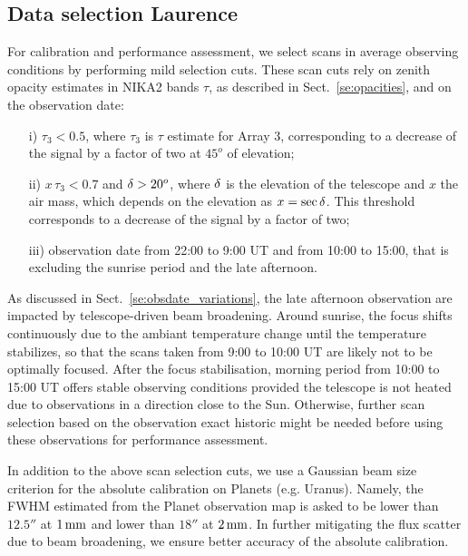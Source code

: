 


\subsection{Data selection {\color{blue} Laurence}}
\label{se:data_selection}

For calibration and performance assessment, we select scans in average
observing conditions by performing mild selection cuts. These scan
cuts rely on zenith opacity estimates in NIKA2 bands $\tau$, as
described in Sect.~\ref{se:opacities}, and on the observation date:
%
\begin{itemize}
\item[i)] $\tau_{3} < 0.5$, where $\tau_{3}$ is $\tau$ estimate for
  Array 3, corresponding to a decrease of the signal by a factor of
  two at $45^{o}$ of elevation;
\item[ii)] $x\, \tau_{3} < 0.7$ and $\delta > 20^{o}$, where $\delta$ is the
  elevation of the telescope and $x$ the
  air mass, which depends on the elevation as $x=\sec \delta$. This
  threshold corresponds to a decrease of the signal by a factor of two;
\item[iii)] observation date from 22:00 to 9:00 UT and from 10:00 to
  15:00, that is excluding the sunrise period and the late afternoon.
\end{itemize}
%
As discussed in Sect.~\ref{se:obsdate_variations}, the late afternoon
observation are impacted by telescope-driven beam broadening. Around
sunrise, the focus shifts continuously due to the ambiant temperature
change until the temperature stabilizes, so that the scans taken from
9:00 to 10:00 UT are likely not to be optimally focused.
After the focus stabilisation, morning period 
from 10:00 to 15:00 UT offers stable observing conditions
provided the telescope is not heated due to observations in a
direction close to the Sun.  Otherwise, further scan selection based on the
observation exact historic might be needed before using these
observations for performance assessment.

   
In addition to the above scan selection cuts, we use a Gaussian beam
size criterion for the absolute calibration on Planets
(e.g. Uranus). Namely, the FWHM estimated from the Planet observation
map is asked to be lower than $12.5''$ at $1\,\rm{mm}$ and lower than $18''$ at
$2\,\rm{mm}$. In further mitigating the flux scatter due to beam broadening, we
ensure better accuracy of the absolute calibration.  




